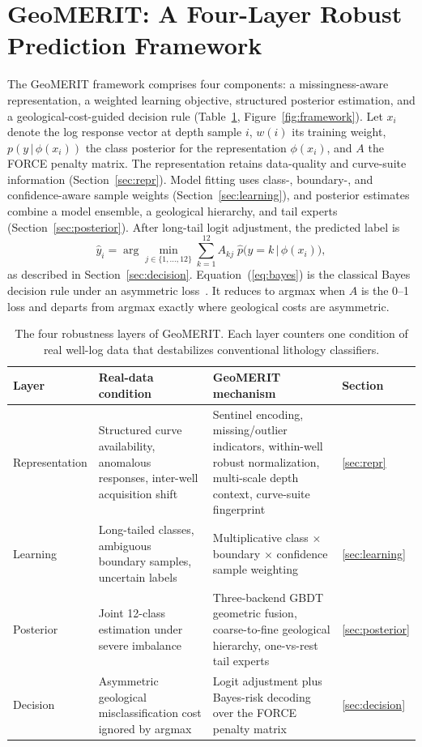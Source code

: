 \documentclass[bdcc,article,submit,pdftex,moreauthors]{Definitions/mdpi}
\begin{document}
\section{GeoMERIT: A Four-Layer Robust Prediction Framework}
\label{sec:method}
The GeoMERIT framework comprises four components: a missingness-aware representation, a
weighted learning objective, structured posterior estimation, and a geological-cost-guided
decision rule (Table~\ref{tab:layers}, Figure~\ref{fig:framework}). Let $x_i$ denote the log
response vector at depth sample $i$, $w(i)$ its training weight,
$p(y\,|\,\phi(x_i))$ the class posterior for the representation $\phi(x_i)$, and $A$ the
FORCE penalty matrix. The representation retains data-quality and curve-suite information
(Section~\ref{sec:repr}). Model fitting uses class-, boundary-, and confidence-aware sample
weights (Section~\ref{sec:learning}), and posterior estimates combine a model ensemble, a
geological hierarchy, and tail experts (Section~\ref{sec:posterior}). After long-tail logit
adjustment, the predicted label is
\begin{equation}
\hat y_i = \arg\min_{j\in\{1,\ldots,12\}} \sum_{k=1}^{12} A_{kj}\;\hat p\!\bigl(y=k\,\big|\,\phi(x_i)\bigr),
\label{eq:bayes}
\end{equation}
as described in Section~\ref{sec:decision}. Equation~(\ref{eq:bayes}) is
the classical Bayes decision rule under an asymmetric loss~\cite{berger1985decision}. It
reduces to argmax when $A$ is the 0--1 loss and departs from argmax exactly where
geological costs are asymmetric.

\begin{table}[H]
\caption{The four robustness layers of GeoMERIT. Each layer counters one condition of real
well-log data that destabilizes conventional lithology classifiers.\label{tab:layers}}
\begin{tabularx}{\textwidth}{lXXl}
\toprule
\textbf{Layer} & \textbf{Real-data condition} & \textbf{GeoMERIT mechanism} & \textbf{Section}\\
\midrule
Representation & Structured curve availability, anomalous responses, inter-well acquisition shift &
Sentinel encoding, missing/outlier indicators, within-well robust normalization, multi-scale
depth context, curve-suite fingerprint & \ref{sec:repr}\\
Learning & Long-tailed classes, ambiguous boundary samples, uncertain labels &
Multiplicative class $\times$ boundary $\times$ confidence sample weighting & \ref{sec:learning}\\
Posterior & Joint 12-class estimation under severe imbalance &
Three-backend GBDT geometric fusion, coarse-to-fine geological hierarchy, one-vs-rest tail experts &
\ref{sec:posterior}\\
Decision & Asymmetric geological misclassification cost ignored by argmax &
Logit adjustment plus Bayes-risk decoding over the FORCE penalty matrix & \ref{sec:decision}\\
\bottomrule
\end{tabularx}
\end{table}
\end{document}
